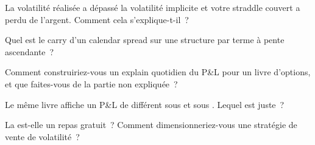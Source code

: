 \begin{interviewq}\label{iq:dv:trading-volatility:2}
La volatilité réalisée a dépassé la volatilité implicite et votre straddle couvert a perdu de l'argent. Comment cela s'explique-t-il~?
\end{interviewq}

\begin{interviewq}\label{iq:dv:trading-volatility:3}
Quel est le carry d'un calendar spread sur une structure par terme à pente ascendante~?
\end{interviewq}

\begin{interviewq}\label{iq:dv:trading-volatility:4}
Comment construiriez-vous un explain quotidien du P\&L pour un livre d'options, et que faites-vous de la partie non expliquée~?
\end{interviewq}

\begin{interviewq}\label{iq:dv:trading-volatility:5}
Le même livre affiche un P\&L de  différent sous  et sous . Lequel est juste~?
\end{interviewq}

\begin{interviewq}\label{iq:dv:trading-volatility:6}
La  est-elle un repas gratuit~? Comment dimensionneriez-vous une stratégie de vente de volatilité~?
\end{interviewq}
